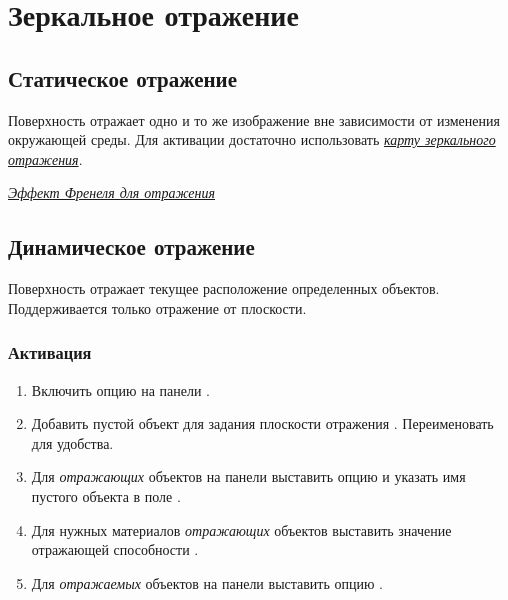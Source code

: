 \documentclass[a4paper,12pt,oneside]{sphinxmanual}
\begin{document}

\section{Зеркальное отражение}
\label{materials:id6}\label{materials:index-5}\label{materials:material-mirror}

\subsection{Статическое отражение}
\label{materials:id7}\label{materials:index-6}\label{materials:reflection-static}
Поверхность отражает одно и то же изображение вне зависимости от изменения окружающей среды. Для активации достаточно использовать {\hyperref[textures:mirror-map]{\emph{карту зеркального отражения}}}.




{\hyperref[materials:fresnel]{\emph{Эффект Френеля для отражения}}}




\subsection{Динамическое отражение}
\label{materials:index-7}\label{materials:id8}
Поверхность отражает текущее расположение определенных объектов. Поддерживается только отражение от плоскости.


\subsubsection{Активация}
\label{materials:id9}\begin{enumerate}
\item {} 
Включить опцию  на панели .

\item {} 
Добавить пустой объект для задания плоскости отражения . Переименовать для удобства.

\item {} 
Для \emph{отражающих} объектов на панели  выставить опцию  и указать имя пустого объекта в поле .

\item {} 
Для нужных материалов \emph{отражающих} объектов выставить значение отражающей способности .

\item {} 
Для \emph{отражаемых} объектов на панели  выставить опцию .

\end{enumerate}
\end{document}
